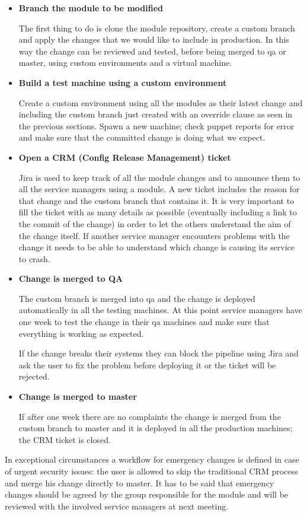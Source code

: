 \begin{itemize}

\item \textbf{Branch the module to be modified}

The first thing to do is clone the module repository, create a custom
branch and apply the changes that we would like to include in production.
In this way the change can be reviewed and tested, before being merged to
qa or master, using custom environments and a virtual machine.

\item \textbf{Build a test machine using a custom environment}

Create a custom environment using all the modules as their latest change
and including the custom branch just created with an override clause as
seen in the previous sections. Spawn a new machine; check puppet reports
for error and make sure that the committed change is doing what we expect.

\item \textbf{Open a CRM (Config Release Management) ticket}

Jira \cite{JiraWebsite} is used to keep track of all the module changes and to
announce them to all the service managers using a module. A new ticket includes
the reason for that change and the custom branch that contains it. It is very
important to fill the ticket with as many details as possible (eventually
including a link to the commit of the change) in order to let the others
understand the aim of the change itself. If another service manager encounters
problems with the change it needs to be able to understand which change is
causing its service to crash.

\item \textbf{Change is merged to QA}

The custom branch is merged into qa and the change is deployed automatically in
all the testing machines. At this point service managers have one week to test
the change in their qa machines and make sure that everything is working as
expected.

If the change breaks their systems they can block the pipeline using Jira
and ask the user to fix the problem before deploying it or the ticket will
be rejected.

\item \textbf{Change is merged to master}

If after one week there are no complaints the change is merged from the
custom branch to master and it is deployed in all the production machines;
the CRM ticket is closed.

\end{itemize}

In exceptional circumstances a workflow for emergency changes is defined in
case of urgent security issues: the user is allowed to skip the traditional CRM
process and merge his change directly to master. It has to be said that
emergency changes should be agreed by the group responsible for the module and
will be reviewed with the involved service managers at next meeting.

